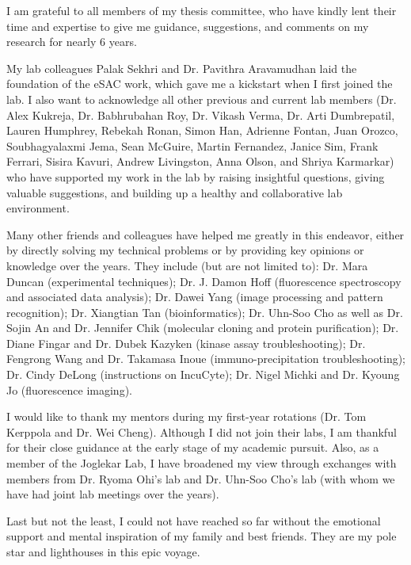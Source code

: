 I am grateful to all members of my thesis committee, who have kindly lent their time and expertise to give me guidance, suggestions, and comments on my research for nearly 6 years.

My lab colleagues Palak Sekhri and Dr. Pavithra Aravamudhan laid the foundation of the eSAC work, which gave me a kickstart when I first joined the lab. I also want to acknowledge all other previous and current lab members (Dr. Alex Kukreja, Dr. Babhrubahan Roy, Dr. Vikash Verma, Dr. Arti Dumbrepatil, Lauren Humphrey, Rebekah Ronan, Simon Han,  Adrienne Fontan, Juan Orozco, Soubhagyalaxmi Jema, Sean McGuire, Martin Fernandez, Janice Sim, Frank Ferrari, Sisira Kavuri, Andrew Livingston, Anna Olson, and Shriya Karmarkar) who have supported my work in the lab by raising insightful questions, giving valuable suggestions, and building up a healthy and collaborative lab environment.

Many other friends and colleagues have helped me greatly in this endeavor, either by directly solving my technical problems or by providing key opinions or knowledge over the years. They include (but are not limited to): Dr. Mara Duncan (experimental techniques); Dr. J. Damon Hoff (fluorescence spectroscopy and associated data analysis); Dr. Dawei Yang (image processing and pattern recognition); Dr. Xiangtian Tan (bioinformatics); Dr. Uhn-Soo Cho as well as Dr. Sojin An and Dr. Jennifer Chik (molecular cloning and protein purification); Dr. Diane Fingar and Dr. Dubek Kazyken (kinase assay troubleshooting); Dr. Fengrong Wang and Dr. Takamasa Inoue (immuno-precipitation troubleshooting); Dr. Cindy DeLong (instructions on IncuCyte); Dr. Nigel Michki and Dr. Kyoung Jo (fluorescence imaging).

I would like to thank my mentors during my first-year rotations (Dr. Tom Kerppola and Dr. Wei Cheng). Although I did not join their labs, I am thankful for their close guidance at the early stage of my academic pursuit. Also, as a member of the Joglekar Lab, I have broadened my view through exchanges with members from Dr. Ryoma Ohi's lab and Dr. Uhn-Soo Cho's lab (with whom we have had joint lab meetings over the years).

Last but not the least, I could not have reached so far without the emotional support and mental inspiration of my family and best friends. They are my pole star and lighthouses in this epic voyage.